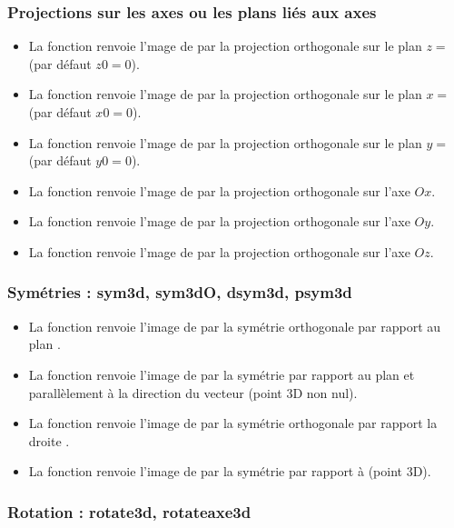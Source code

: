 \subsubsection{Projections sur les axes ou les plans liés aux axes}

\begin{itemize}
    \item La fonction  renvoie l'mage de  par la projection orthogonale sur le plan $z=$ (par défaut $z0=0$).
    \item La fonction  renvoie l'mage de  par la projection orthogonale sur le plan $x=$ (par défaut $x0=0$).
    \item La fonction  renvoie l'mage de  par la projection orthogonale sur le plan $y=$ (par défaut $y0=0$).
\item La fonction  renvoie l'mage de  par la projection orthogonale sur l'axe $Ox$.
\item La fonction  renvoie l'mage de  par la projection orthogonale sur l'axe $Oy$.
\item La fonction  renvoie l'mage de  par la projection orthogonale sur l'axe $Oz$.
\end{itemize}

\subsubsection{Symétries : sym3d, sym3dO, dsym3d, psym3d}

\begin{itemize}
    \item La fonction  renvoie l'image de  par la symétrie orthogonale par rapport au plan .
    \item La fonction  renvoie l'image de  par la symétrie par rapport au plan  et parallèlement à la direction du vecteur  (point 3D non nul).
    \item La fonction  renvoie l'image de  par la symétrie orthogonale par rapport la droite .
    \item La fonction  renvoie l'image de  par la symétrie par rapport à  (point 3D).
\end{itemize}

\subsubsection{Rotation : rotate3d, rotateaxe3d}

